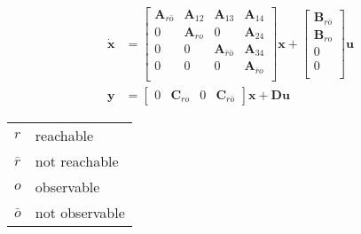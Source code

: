 \begin{align*}
    \dot{\mathbf{x}} & = \begin{bmatrix}
                             \mathbf{A}_{r\bar{o}} & \mathbf{A}_{12} & \mathbf{A}_{13}             & \mathbf{A}_{14}       \\
                             0                     & \mathbf{A}_{ro} & 0                           & \mathbf{A}_{24}       \\
                             0                     & 0               & \mathbf{A}_{\bar{r}\bar{o}} & \mathbf{A}_{34}       \\
                             0                     & 0               & 0                           & \mathbf{A}_{\bar{r}o} \\
                         \end{bmatrix}
    \mathbf{x} + \begin{bmatrix}
                     \mathbf{B}_{r\bar{o}} \\
                     \mathbf{B}_{ro}       \\
                     0                     \\
                     0                     \\
                 \end{bmatrix}
    \mathbf{u}                                                                                                         \\
    \mathbf{y}       & = \begin{bmatrix}
                             0 & \mathbf{C}_{ro} & 0 & \mathbf{C}_{r\bar{o}}
                         \end{bmatrix}
    \mathbf{x} + \mathbf{Du}
\end{align*}

\newpar{}

\begin{tabularx}{\linewidth}{@{}ll@{}}
    $r$       & reachable      \\
    $\bar{r}$ & not reachable  \\
    $o$       & observable     \\
    $\bar{o}$ & not observable \\
\end{tabularx}

